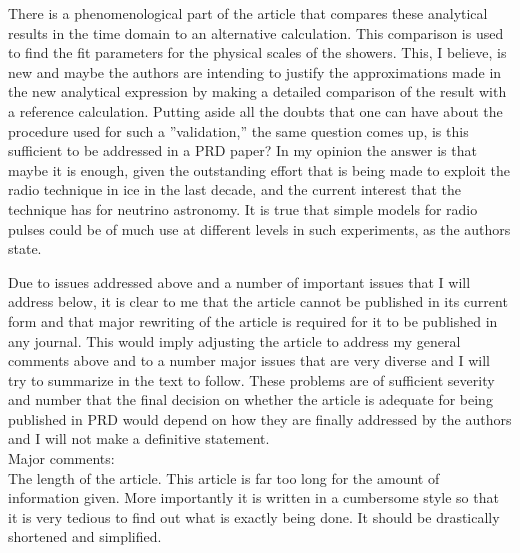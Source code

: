 \documentclass[12pt]{article}
\begin{document}
There is a phenomenological part of the article that compares these analytical results in the time domain to an alternative calculation. This comparison is used to find the fit parameters for the physical
scales of the showers. This, I believe, is new and maybe the authors are intending to justify the approximations made in the new analytical expression by making a detailed comparison of the result with a
reference calculation. Putting aside all the doubts that one can have about the procedure used for such a ''validation,'' the same question comes up, is this sufficient to be addressed in a PRD paper? In my
opinion the answer is that maybe it is enough, given the outstanding effort that is being made to exploit the radio technique in ice in the last decade, and the current interest that the technique has for
neutrino astronomy. It is true that simple models for radio pulses could be of much use at different levels in such experiments, as the authors state.  

Due to issues addressed above and a number of important issues that I will address below, it is clear to me that the article cannot be published in its current form and that major rewriting of the article is required for it to be published in any journal. This would imply adjusting the article to address my general comments above and to a number major issues that are very diverse and I will try to summarize
in the text to follow. These problems are of sufficient severity and number that the final decision on whether the article is adequate for being published in PRD would depend on how they are finally addressed
by the authors and I will not make a definitive statement.  \\

Major comments: \\

The length of the article. This article is far too long for the amount of information given. More importantly it is written in a cumbersome style so that it is very tedious to find out what is exactly being done. It should be drastically shortened and simplified.  
\end{document}
